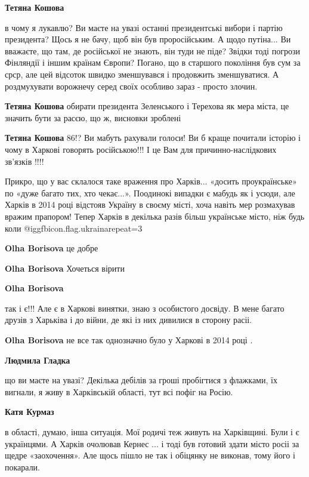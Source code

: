 \begin{itemize}
\begin{itemize}
\textbf{Тетяна Кошова} 

в чому я лукавлю? Ви маєте на увазі останні президентські вибори і партію
президента? Щось я не бачу, щоб він був проросійським. А щодо путіна... Ви
вважаєте, що там, де російської не знають, він туди не піде? Звідки тоді
погрози Фінляндії і іншим країнам Європи? Погано, що в старшого покоління був
сум за срср, але цей відсоток швидко зменшувався і продовжить зменшуватися. А
роздмухувати ворожнечу серед своїх особливо зараз - просто злочин.

\textbf{Тетяна Кошова}  обирати президента Зеленського і Терехова як мера міста, це значить бути за расєю, що ж, висновки зроблені

\textbf{Тетяна Кошова} 86!? Ви мабуть рахували голоси! Ви б краще почитали історію і чому в Харкові говорять російською!!! І це Вам для причинно-наслідкових зв'язків !!!!

\end{itemize} %


Прикро, що у вас склалося таке враження про Харків... «досить проукраїнське» по
«дуже багато тих, хто чекає...». Поодинокі випадки є мабудь як і усюди, але
Харків в 2014 році відстояв Україну в своєму місті, хоча навіть мер розмахував
вражим прапором! Тепер Харків в декілька разів більш українське місто, ніж будь
коли @igg{fbicon.flag.ukraina}{repeat=3}

\begin{itemize} %
\textbf{Olha Borisova} це добре

\textbf{Olha Borisova} Хочеться вірити

\textbf{Olha Borisova} 

так і є!!! Але є в Харкові винятки, знаю з особистого досвіду. В мене багато
друзів з Харьківа і до війни, де які із них дивилися в сторону расіі.

\textbf{Olha Borisova} не все так однозначно було у Харкові в 2014 році .

\textbf{Людмила Гладка} 

що ви маєте на увазі? Декілька дебілів за гроші пробігтися з флажками, їх
вигнали, я живу в Харківській області, тут всі пофіг на Росію.

\textbf{Катя Курмаз} 

в області, думаю, інша ситуація. Мої родичі теж живуть на Харківщині. Були
і є українцями. А Харків очолював Кернес ... і тоді був готовий здати місто
росіі за щедре «заохочення». Але щось пішло не так і обіцянку не виконав, тому
його і покарали.


\end{itemize}
\end{itemize}
